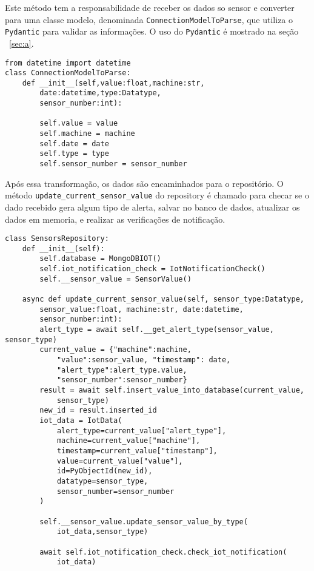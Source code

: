 Este método tem a responsabilidade de receber os dados so sensor e converter para uma classe modelo, denominada \texttt{ConnectionModelToParse}, que utiliza o \texttt{Pydantic} para validar as informações. O uso do \texttt{Pydantic} é mostrado na seção ~\ref{sec:a}.

\begin{verbatim}
from datetime import datetime
class ConnectionModelToParse:
    def __init__(self,value:float,machine:str,
        date:datetime,type:Datatype,
        sensor_number:int):

        self.value = value
        self.machine = machine
        self.date = date
        self.type = type
        self.sensor_number = sensor_number
\end{verbatim}

Após essa transformação, os dados são encaminhados para o repositório. O método \texttt{update\_current\_sensor\_value} do repository é chamado para checar se o dado recebido gera algum tipo de alerta, salvar no banco de dados, atualizar os dados em memoria, e realizar as verificações de notificação.

\begin{verbatim}
class SensorsRepository:
    def __init__(self):
        self.database = MongoDBIOT()
        self.iot_notification_check = IotNotificationCheck()
        self.__sensor_value = SensorValue()

    async def update_current_sensor_value(self, sensor_type:Datatype,
        sensor_value:float, machine:str, date:datetime, 
        sensor_number:int):
        alert_type = await self.__get_alert_type(sensor_value, sensor_type)
        current_value = {"machine":machine,
            "value":sensor_value, "timestamp": date,
            "alert_type":alert_type.value,
            "sensor_number":sensor_number}
        result = await self.insert_value_into_database(current_value, 
            sensor_type)
        new_id = result.inserted_id
        iot_data = IotData(
            alert_type=current_value["alert_type"],
            machine=current_value["machine"],
            timestamp=current_value["timestamp"],
            value=current_value["value"],
            id=PyObjectId(new_id),
            datatype=sensor_type,
            sensor_number=sensor_number
        )
        
        self.__sensor_value.update_sensor_value_by_type(
            iot_data,sensor_type)
        
        await self.iot_notification_check.check_iot_notification(
            iot_data)
\end{verbatim}

